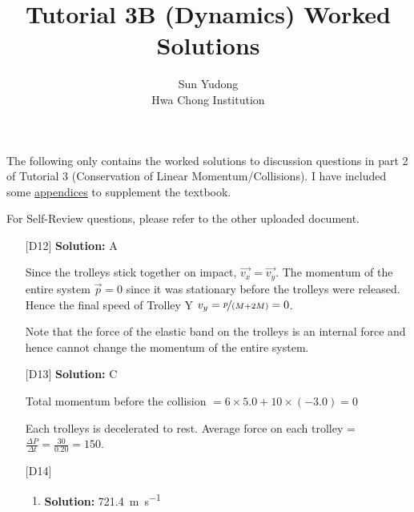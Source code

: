 \documentclass[11pt]{article}
\title{Tutorial 3B (Dynamics) Worked Solutions}
\author{Sun Yudong\\Hwa Chong Institution}
\newcommand{\solution}[1]{\textbf{Solution: } #1 \hspace{5mm}}
\begin{document}
	\maketitle
	The following only contains the worked solutions to discussion questions in part 2 of Tutorial 3 (Conservation of Linear Momentum/Collisions). I have included some \hyperref[appdx]{appendices} to supplement the textbook.
	
	For Self-Review questions, please refer to the other uploaded document. 
	
	\begin{enumerate}
		\item[{[D12]}] \solution{A}
		
		Since the trolleys stick together on impact, $\vec{v_x} = \vec{v_y}$. The momentum of the entire system $\vec{p} = 0$ since it was stationary before the trolleys were released. Hence the final speed of Trolley Y $v_y = \nicefrac{p}{(M + 2M)} = 0$.
		
		Note that the force of the elastic band on the trolleys is an internal force and hence cannot change the momentum of the entire system.
		\vfill 
		\item[{[D13]}] \solution{C}
		
		Total momentum before the collision $= 6 \times 5.0 + 10 \times (-3.0) = 0$
		
		Each trolleys is decelerated to rest. Average force on each trolley = $\displaystyle \frac{\Delta P}{\Delta t} = \frac{30}{0.20} = 150$.
		\vfill
		\item[{[D14]}] 
		\begin{enumerate}
			\item \solution{\SI{721.4}{\meter\per\second}}
			

\end{enumerate}
\end{enumerate}
\end{document}
